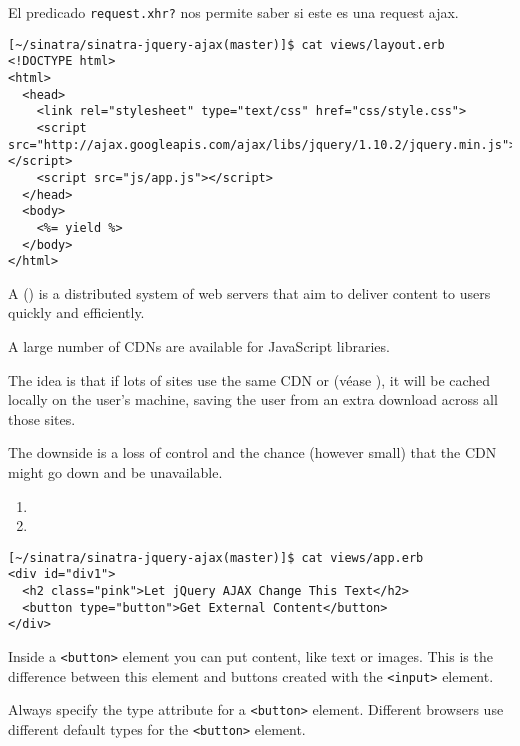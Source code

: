 
El predicado
\verb|request.xhr?| nos permite saber si este es una request ajax.

\begin{verbatim}
[~/sinatra/sinatra-jquery-ajax(master)]$ cat views/layout.erb 
<!DOCTYPE html>
<html>
  <head>
    <link rel="stylesheet" type="text/css" href="css/style.css">
    <script src="http://ajax.googleapis.com/ajax/libs/jquery/1.10.2/jquery.min.js"></script>
    <script src="js/app.js"></script>
  </head>
  <body>
    <%= yield %>
  </body>
</html>
\end{verbatim}

A  () is a distributed system of web servers 
that aim to deliver content to users quickly and efficiently. 

A large number of CDNs are available for JavaScript libraries. 

The idea is that if lots of sites use the same CDN or 
(véase
), 
it will be cached locally on the user’s machine, saving the user 
from an extra download across all those sites. 

The downside is a loss of control and the chance (however small) 
that the CDN might go down and be unavailable.

\begin{enumerate}
\item 
{}
\item 
{}
\end{enumerate}

\begin{verbatim}
[~/sinatra/sinatra-jquery-ajax(master)]$ cat views/app.erb 
<div id="div1">
  <h2 class="pink">Let jQuery AJAX Change This Text</h2>
  <button type="button">Get External Content</button>
</div>
\end{verbatim}
Inside a \verb|<button>| element you can put content, like text or images. This is the difference between this element and buttons created with the \verb|<input>| element.

Always specify the type attribute for a \verb|<button>| element. Different browsers use different default types for the \verb|<button>| element.

